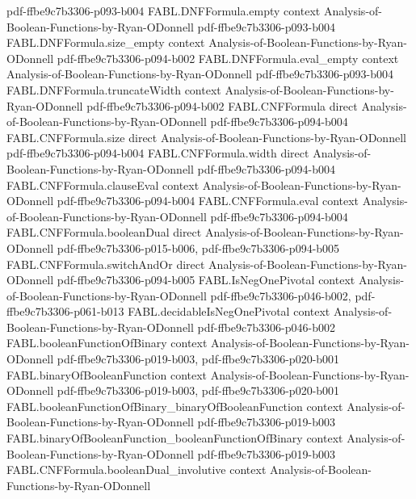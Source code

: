 \begin{theorem}
  {pdf-ffbe9c7b3306-p093-b004}
\proofstep
  {FABL.DNFFormula.empty}
  {context}
  {Analysis-of-Boolean-Functions-by-Ryan-ODonnell}
  {pdf-ffbe9c7b3306-p093-b004}
\proofstep
  {FABL.DNFFormula.size_empty}
  {context}
  {Analysis-of-Boolean-Functions-by-Ryan-ODonnell}
  {pdf-ffbe9c7b3306-p094-b002}
\proofstep
  {FABL.DNFFormula.eval_empty}
  {context}
  {Analysis-of-Boolean-Functions-by-Ryan-ODonnell}
  {pdf-ffbe9c7b3306-p093-b004}
\proofstep
  {FABL.DNFFormula.truncateWidth}
  {context}
  {Analysis-of-Boolean-Functions-by-Ryan-ODonnell}
  {pdf-ffbe9c7b3306-p094-b002}
\proofstep
  {FABL.CNFFormula}
  {direct}
  {Analysis-of-Boolean-Functions-by-Ryan-ODonnell}
  {pdf-ffbe9c7b3306-p094-b004}
\proofstep
  {FABL.CNFFormula.size}
  {direct}
  {Analysis-of-Boolean-Functions-by-Ryan-ODonnell}
  {pdf-ffbe9c7b3306-p094-b004}
\proofstep
  {FABL.CNFFormula.width}
  {direct}
  {Analysis-of-Boolean-Functions-by-Ryan-ODonnell}
  {pdf-ffbe9c7b3306-p094-b004}
\proofstep
  {FABL.CNFFormula.clauseEval}
  {context}
  {Analysis-of-Boolean-Functions-by-Ryan-ODonnell}
  {pdf-ffbe9c7b3306-p094-b004}
\proofstep
  {FABL.CNFFormula.eval}
  {context}
  {Analysis-of-Boolean-Functions-by-Ryan-ODonnell}
  {pdf-ffbe9c7b3306-p094-b004}
\proofstep
  {FABL.CNFFormula.booleanDual}
  {direct}
  {Analysis-of-Boolean-Functions-by-Ryan-ODonnell}
  {pdf-ffbe9c7b3306-p015-b006,
    pdf-ffbe9c7b3306-p094-b005}
\proofstep
  {FABL.CNFFormula.switchAndOr}
  {direct}
  {Analysis-of-Boolean-Functions-by-Ryan-ODonnell}
  {pdf-ffbe9c7b3306-p094-b005}
\proofstep
  {FABL.IsNegOnePivotal}
  {context}
  {Analysis-of-Boolean-Functions-by-Ryan-ODonnell}
  {pdf-ffbe9c7b3306-p046-b002,
    pdf-ffbe9c7b3306-p061-b013}
\proofstep
  {FABL.decidableIsNegOnePivotal}
  {context}
  {Analysis-of-Boolean-Functions-by-Ryan-ODonnell}
  {pdf-ffbe9c7b3306-p046-b002}
\proofstep
  {FABL.booleanFunctionOfBinary}
  {context}
  {Analysis-of-Boolean-Functions-by-Ryan-ODonnell}
  {pdf-ffbe9c7b3306-p019-b003,
    pdf-ffbe9c7b3306-p020-b001}
\proofstep
  {FABL.binaryOfBooleanFunction}
  {context}
  {Analysis-of-Boolean-Functions-by-Ryan-ODonnell}
  {pdf-ffbe9c7b3306-p019-b003,
    pdf-ffbe9c7b3306-p020-b001}
\proofstep
  {FABL.booleanFunctionOfBinary_binaryOfBooleanFunction}
  {context}
  {Analysis-of-Boolean-Functions-by-Ryan-ODonnell}
  {pdf-ffbe9c7b3306-p019-b003}
\proofstep
  {FABL.binaryOfBooleanFunction_booleanFunctionOfBinary}
  {context}
  {Analysis-of-Boolean-Functions-by-Ryan-ODonnell}
  {pdf-ffbe9c7b3306-p019-b003}
\proofstep
  {FABL.CNFFormula.booleanDual_involutive}
  {context}
  {Analysis-of-Boolean-Functions-by-Ryan-ODonnell}

\end{theorem}
